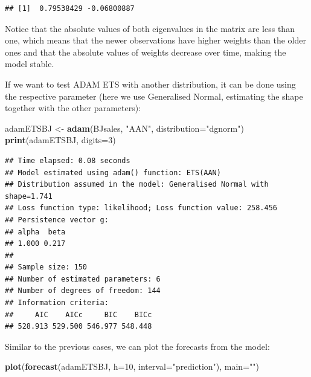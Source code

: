 \documentclass[]{book}
\newenvironment{Shaded}{\begin{snugshade}}{\end{snugshade}}
\newcommand{\DataTypeTok}[1]{\textcolor[rgb]{0.13,0.29,0.53}{#1}}
\newcommand{\DecValTok}[1]{\textcolor[rgb]{0.00,0.00,0.81}{#1}}
\newcommand{\KeywordTok}[1]{\textcolor[rgb]{0.13,0.29,0.53}{\textbf{#1}}}
\newcommand{\NormalTok}[1]{#1}
\newcommand{\StringTok}[1]{\textcolor[rgb]{0.31,0.60,0.02}{#1}}
\theoremstyle{definition}
\theoremstyle{definition}
\theoremstyle{definition}
\theoremstyle{definition}
\theoremstyle{remark}
\begin{document}
\begin{verbatim}
## [1]  0.79538429 -0.06800887
\end{verbatim}

Notice that the absolute values of both eigenvalues in the matrix are less than one, which means that the newer observations have higher weights than the older ones and that the absolute values of weights decrease over time, making the model stable.

If we want to test ADAM ETS with another distribution, it can be done using the respective parameter (here we use Generalised Normal, estimating the shape together with the other parameters):

\begin{Shaded}
\begin{Highlighting}[]
\NormalTok{adamETSBJ <-}\StringTok{ }\KeywordTok{adam}\NormalTok{(BJsales, }\StringTok{"AAN"}\NormalTok{, }\DataTypeTok{distribution=}\StringTok{"dgnorm"}\NormalTok{)}
\KeywordTok{print}\NormalTok{(adamETSBJ, }\DataTypeTok{digits=}\DecValTok{3}\NormalTok{)}
\end{Highlighting}
\end{Shaded}

\begin{verbatim}
## Time elapsed: 0.08 seconds
## Model estimated using adam() function: ETS(AAN)
## Distribution assumed in the model: Generalised Normal with shape=1.741
## Loss function type: likelihood; Loss function value: 258.456
## Persistence vector g:
## alpha  beta 
## 1.000 0.217 
## 
## Sample size: 150
## Number of estimated parameters: 6
## Number of degrees of freedom: 144
## Information criteria:
##     AIC    AICc     BIC    BICc 
## 528.913 529.500 546.977 548.448
\end{verbatim}

Similar to the previous cases, we can plot the forecasts from the model:

\begin{Shaded}
\begin{Highlighting}[]
\KeywordTok{plot}\NormalTok{(}\KeywordTok{forecast}\NormalTok{(adamETSBJ, }\DataTypeTok{h=}\DecValTok{10}\NormalTok{, }\DataTypeTok{interval=}\StringTok{"prediction"}\NormalTok{),}
     \DataTypeTok{main=}\StringTok{""}\NormalTok{)}
\end{Highlighting}
\end{Shaded}
\end{document}
